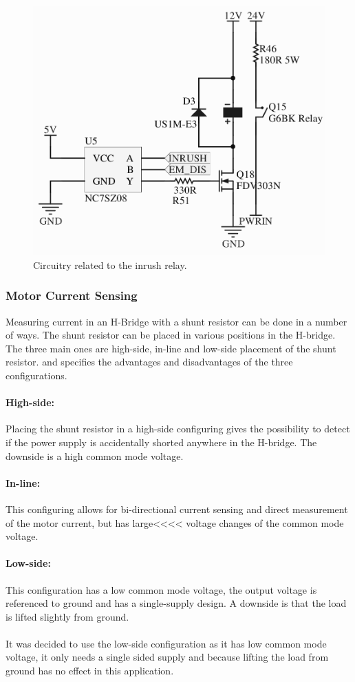 \begin{figure}[H]
	\centering
	\includegraphics[width=.5\linewidth]{graphics/relay_circuit}
	\caption{Circuitry related to the inrush relay.}
	\label{fig:relaycircuit}
\end{figure}


\subsubsection{Motor Current Sensing}
Measuring current in an H-Bridge with a shunt resistor can be done in a number of ways.
The shunt resistor can be placed in various positions in the H-bridge.
The three main ones are high-side, in-line and low-side placement of the shunt resistor.
\cite{shunt_placement} and \cite{Current_Sense_Circuit_Collection} specifies the advantages and disadvantages of the three configurations.

\paragraph{High-side:} 
Placing the shunt resistor in a high-side configuring gives the possibility to detect if the power supply is accidentally shorted anywhere in the H-bridge. 
The downside is a high common mode voltage.

\paragraph{In-line:} 
This configuring allows for bi-directional current sensing and direct measurement of the motor current, but has large<<<< voltage changes of the common mode voltage.

\paragraph{Low-side:} 
This configuration has a low common mode voltage, the output voltage is referenced to ground and has a single-supply design.
A downside is that the load is lifted slightly from ground.
\\~\\
It was decided to use the low-side configuration as it has low common mode voltage, it only needs a single sided supply and because lifting the load from ground has no effect in this application.

